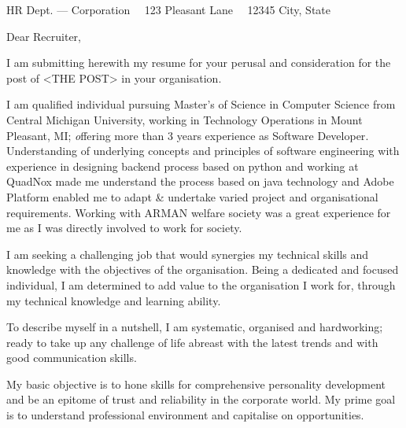 \documentclass{scrlttr2}
\renewcommand{\\}{\ {\large\textperiodcentered}\ }
\begin{document}

\begin{letter}{ %
HR Dept. --- Corporation\\
123 Pleasant Lane\\
12345 City, State
}


\opening{Dear Recruiter,}
I am submitting herewith my resume for your perusal and consideration for the post of <THE POST> in your organisation.\\

I am qualified individual pursuing Master's of Science in Computer Science from Central Michigan University, working in Technology Operations in Mount Pleasant, MI; {\emph offering more than 3 years experience as Software Developer}. Understanding of underlying concepts and principles of software engineering with experience in designing backend process based on python and working at QuadNox made me understand the process based on java technology and Adobe Platform enabled me to adapt \& undertake varied project and organisational requirements. Working with ARMAN welfare society was a great experience for me as I was directly involved to work for society.\\

I am seeking a challenging job that would synergies my technical skills and knowledge with the objectives of the organisation. Being a dedicated and focused individual, I am determined to add value to the organisation I work for, through my technical knowledge and learning ability.\\

To describe myself in a nutshell, I am systematic, organised and hardworking; ready to take up any challenge of life abreast with the latest trends and with good communication skills.\\

My basic objective is to hone skills for comprehensive personality development and be an epitome of trust and reliability in the corporate world. My prime goal is to understand professional environment and capitalise on opportunities.\\


\end{letter}
\end{document}
